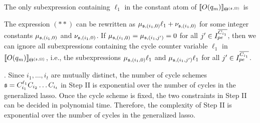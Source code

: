 The only subexpression containing $\ell_1$ in the constant atom of  $\llbracket O(q_m)\rrbracket_{\Theta^{({\mathfrak{s} },\Omega)}}$ is
\begin{center}
\end{center}
%
The expression $(\ast\ast)$ can be rewritten as $\mu_{{\mathfrak{s} },(i_1,0)} \ell_1 + \nu_{{\mathfrak{s} },(i_1,0)}$ for some integer constants $\mu_{{\mathfrak{s} }, (i_1,0)}$ and $\nu_{{\mathfrak{s} }, (i_1,0)}$. If $\mu_{{\mathfrak{s} },(i_1,0)}=\mu_{{\mathfrak{s} },(i_1,j')}=0$ for all $j' \in I^{\overline{C_{i_1}}}_{pe}$, then we can ignore all subexpressions containing the cycle counter variable $\ell_1$ in   $\llbracket O(q_m)\rrbracket_{\Theta^{({\mathfrak{s} },\Omega)}}$, i.e., the subexpressions $\mu_{{\mathfrak{s} },(i_1,0)}\ell_1$ and $\mu_{{\mathfrak{s} },(i_1,j')}\ell_1$ for all $j' \in I^{\overline{C_{i_1}}}_{pe}$.\smallskip\\
\bigskip

. Since $i_1,\dots, i_t$ are mutually distinct, the number of cycle schemes ${\mathfrak{s} } = C_{i_1}^{\ell_1} C_{i_2} \dots C_{i_t}$ in Step II is exponential over the number of cycles in the generalized lasso. Once the cycle scheme is fixed, the two constraints in Step II can be decided in polynomial time. Therefore, the complexity of Step II is exponential over the number of cycles in the generalized lasso.

\smallskip


